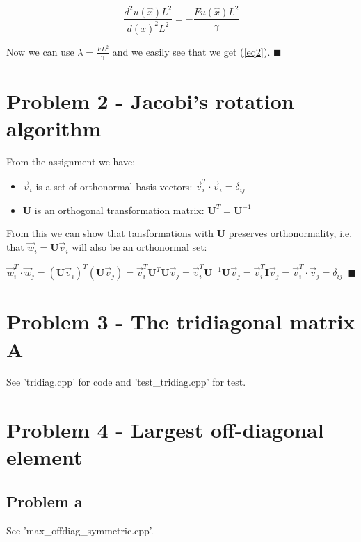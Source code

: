 \documentclass[english,notitlepage]{revtex4-1}  %
\begin{document}
\begin{equation*}
    \frac{d^2u(\hat{x})L^2}{d(\hat{x})^2L^2} = - \frac{Fu(\hat{x})L^2}{\gamma}
\end{equation*}

Now we can use $\lambda = \frac{FL^2}{\gamma}$ and we easily see that we get (\ref{eq2}). $\blacksquare$


\section*{Problem 2 - Jacobi’s rotation algorithm}

From the assignment we have:

\begin{itemize}
    \item $\vec{v}_i$ is a set of orthonormal basis vectors: $\vec{v}_i^T \cdot \vec{v}_i = \delta_{ij}$
    \item $\mathbf{U}$ is an orthogonal transformation matrix: $\mathbf{U}^T = \mathbf{U}^{-1}$
\end{itemize}

From this we can show that tansformations with $\mathbf{U}$ preserves orthonormality, i.e. that $\vec{w}_i = \mathbf{U} \vec{v}_i$ will also be an orthonormal set:

\begin{equation*}
    \vec{w}_i^T \cdot \vec{w}_j = (\mathbf{U}\vec{v}_i)^T (\mathbf{U} \vec{v}_j) = \vec{v}_i^T \mathbf{U}^T \mathbf{U} \vec{v}_j = \vec{v}_i^T \mathbf{U}^{-1} \mathbf{U} \vec{v}_j 
    = \vec{v}_i^T  \mathbf{I} \vec{v}_j = \vec{v}_i^T  \cdot \vec{v}_j = \delta_{ij} \;\; \blacksquare
\end{equation*}


\section*{Problem 3 - The tridiagonal matrix $\mathbf{A}$}
See 'tridiag.cpp' for code and 'test\_tridiag.cpp' for test. 

\section*{Problem 4 - Largest off-diagonal element}

\subsection*{Problem a}
See 'max\_offdiag\_symmetric.cpp'.
\end{document}
